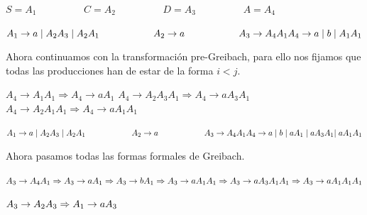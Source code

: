 $ S = A_{1} \hspace{2cm} C = A_{2} \hspace{2cm} D = A_{3} \hspace{2cm} A = A_{4} $ \newline

$ A_{1} \rightarrow a \; | \; A_{2}A_{3} \; | \; A_{2}A_{1} \hspace{2cm} A_{2} \rightarrow  a \hspace{2cm} A_{3} \rightarrow  A_{4}A_{1} \hspace{2cm} \newline A_{4} \rightarrow a \; | \; b \; | \; A_{1}A_{1} $ \newline

Ahora continuamos con la transformación pre-Greibach, para ello nos fijamos que todas las producciones han de estar de la forma $ i<j $. \newline

$ A_{4} \rightarrow A_{1}A_{1} \Rightarrow A_{4} \rightarrow  aA_{1} $ \newline
$ A_{4} \rightarrow A_{2}A_{3}A_{1} \Rightarrow A_{4} \rightarrow  aA_{3}A_{1} $ \newline
$ A_{4} \rightarrow A_{2}A_{1}A_{1} \Rightarrow A_{4} \rightarrow  aA_{1}A_{1} $ \newline

$ A_{1} \rightarrow a \; | \; A_{2}A_{3} \; | \; A_{2}A_{1} \hspace{2cm} A_{2} \rightarrow  a \hspace{2cm} A_{3} \rightarrow  A_{4}A_{1} \hspace{2cm} \newline A_{4} \rightarrow a \; | \; b \; | \; aA_{1} \; | \; aA_{3}A_{1} | \; aA_{1}A_{1} $ \newline

Ahora pasamos todas las formas formales de Greibach. \newline

$ A_{3} \rightarrow A_{4}A_{1} \newline \Rightarrow A_{3} \rightarrow aA_{1} \Rightarrow A_{3} \rightarrow
 bA_{1} \Rightarrow A_{3} \rightarrow aA_{1}A_{1} \Rightarrow A_{3} \rightarrow aA_{3}A_{1}A_{1} \Rightarrow A_{3} \rightarrow aA_{1}A_{1}A_{1} $ \newline

$ A_{3} \rightarrow A_{2}A_{3} \newline \Rightarrow A_{1} \rightarrow aA_{3} $ \newline

